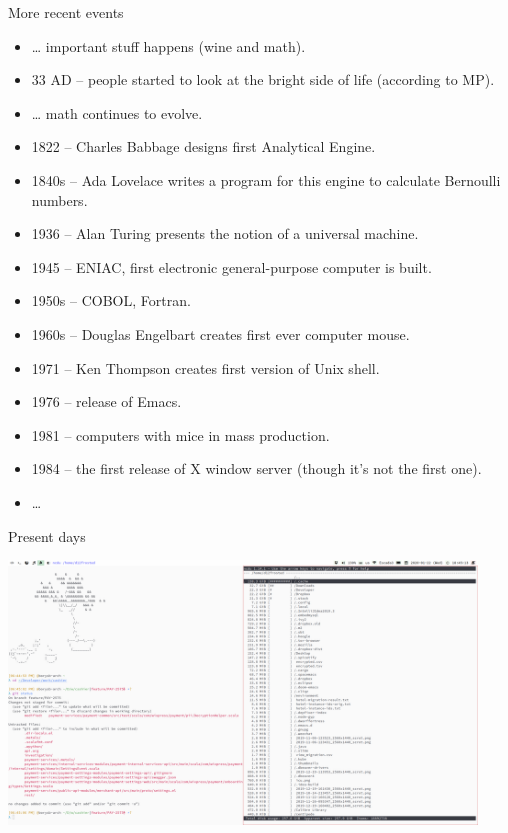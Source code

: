 \documentclass[presentation,aspectratio=169,smaller]{beamer}
\begin{document}
\begin{frame}[label={sec:org4132d52}]{More recent events}
\begin{itemize}
\item \ldots{} important stuff happens (wine and math).
\item 33 AD -- people started to look at the bright side of life (according to MP).
\item \ldots{} math continues to evolve.
\item 1822 -- Charles Babbage designs first Analytical Engine.
\item 1840s -- Ada Lovelace writes a program for this engine to calculate
Bernoulli numbers.
\item 1936 -- Alan Turing presents the notion of a universal machine.
\item 1945 -- ENIAC, first electronic general-purpose computer is built.
\item 1950s -- COBOL, Fortran.
\item 1960s -- Douglas Engelbart creates first ever computer mouse.
\item 1971 -- Ken Thompson creates first version of Unix shell.
\item 1976 -- release of Emacs.
\item 1981 -- computers with mice in mass production.
\item 1984 -- the first release of X window server (though it's not the first one).
\item \ldots{}
\end{itemize}
\end{frame}

\begin{frame}[label={sec:org6da2b84}]{Present days}
\begin{center}
\includegraphics[height=7.0cm]{images/evolution-3.png}
\end{center}
\end{frame}
\end{document}
